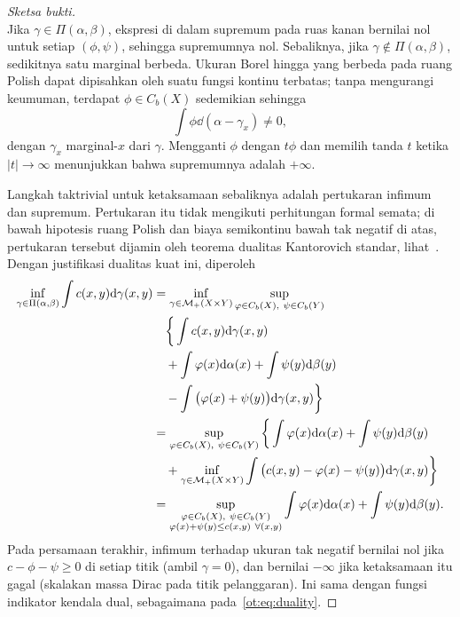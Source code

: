 \begin{proof}[Sketsa bukti]
\begin{equation}
    \end{equation}
    Jika $\gamma\in\Pi(\alpha,\beta)$, ekspresi di dalam supremum pada ruas kanan bernilai nol untuk setiap $(\phi,\psi)$, sehingga supremumnya nol. Sebaliknya, jika $\gamma\notin\Pi(\alpha,\beta)$, sedikitnya satu marginal berbeda. Ukuran Borel hingga yang berbeda pada ruang Polish dapat dipisahkan oleh suatu fungsi kontinu terbatas; tanpa mengurangi keumuman, terdapat $\phi\in C_b(X)$ sedemikian sehingga
    \begin{equation}
        \int\phi\dd(\alpha-\gamma_x)\neq0,
    \end{equation}
    dengan $\gamma_x$ marginal-$x$ dari $\gamma$. Mengganti $\phi$ dengan $t\phi$ dan memilih tanda $t$ ketika $|t|\rightarrow\infty$ menunjukkan bahwa supremumnya adalah $+\infty$.

    Langkah taktrivial untuk ketaksamaan sebaliknya adalah pertukaran infimum dan supremum. Pertukaran itu tidak mengikuti perhitungan formal semata; di bawah hipotesis ruang Polish dan biaya semikontinu bawah tak negatif di atas, pertukaran tersebut dijamin oleh teorema dualitas Kantorovich standar, lihat~\cite[Theorem 5.10]{villani2009optimal}. Dengan justifikasi dualitas kuat ini, diperoleh
    \begin{equation}
        \begin{aligned}
            \inf_{\gamma\in\Pi(\alpha,\beta)}
            \int c(x,y)\mathrm{d}\gamma(x,y)
            &= \inf_{\gamma\in\mathcal{M}_+(X\times Y)}
            \sup_{\varphi\in C_b(X),\ \psi\in C_b(Y)}
            \\
            &\quad\bigg\{\int c(x,y)\mathrm{d}\gamma(x,y)\\
            &\quad+\int\varphi(x)\mathrm{d}\alpha(x)+\int\psi(y)\mathrm{d}\beta(y)
            \\
            &\quad-\int\big(\varphi(x)+\psi(y)\big)\mathrm{d}\gamma(x,y)\bigg\}\\
            &= \sup_{\varphi\in C_b(X),\ \psi\in C_b(Y)}
            \bigg\{\int\varphi(x)\mathrm{d}\alpha(x)+\int\psi(y)\mathrm{d}\beta(y)\\
            &\quad+\inf_{\gamma\in\mathcal{M}_+(X\times Y)}
            \int\big(c(x,y)-\varphi(x)-\psi(y)\big)\mathrm{d}\gamma(x,y)\bigg\}\\
            &= \sup_{\substack{\varphi\in C_b(X),\ \psi\in C_b(Y)\\
            \varphi(x)+\psi(y)\leq c(x,y)\ \forall(x,y)}}
            \int\varphi(x)\mathrm{d}\alpha(x)+\int\psi(y)\mathrm{d}\beta(y).
        \end{aligned}
    \end{equation}
    Pada persamaan terakhir, infimum terhadap ukuran tak negatif bernilai nol jika $c-\phi-\psi\geq0$ di setiap titik (ambil $\gamma=0$), dan bernilai $-\infty$ jika ketaksamaan itu gagal (skalakan massa Dirac pada titik pelanggaran). Ini sama dengan fungsi indikator kendala dual, sebagaimana pada~\eqref{ot:eq:duality}.
\end{proof}

